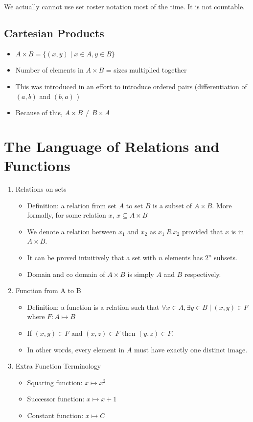 \documentclass[a4paper]{report}
\begin{document}
We actually cannot use set roster notation most of the time. It is not countable.

\subsection{Cartesian Products}

\begin{itemize}
    \item $A \times B = \{(x, y)  \mid x \in A, y \in B\}$
    \item Number of elements in $A \times B$ = sizes multiplied together
    \item This was introduced in an effort to introduce ordered pairs (differentiation of $(a, b)$ and $(b, a)$ )
    \item Because of this, $A \times B \neq B \times A$
\end{itemize}

\section{The Language of Relations and Functions}

\begin{enumerate}
    \item Relations on sets
        \begin{itemize}
            \item Definition: a relation from set $A$ to set $B$ is a subset of $A \times B$. More formally, for some relation $x$, $x \subseteq A \times B$
            \item We denote a relation between $x_1$ and $x_2$ as $x_1 \: R \: x_2$ provided that $x$ is in  $A \times B$.
            \item It can be proved intuitively that a set with $n$ elements has  $2^n$ subsets.
            \item Domain and co domain of $A \times B$ is simply $A$ and  $B$ respectively.
        \end{itemize}
    \item Function from A to B
        \begin{itemize}
            \item Definition: a function is a relation such that $\forall x \in A, \exists y \in B  \mid (x, y) \in F$ where $F: A \mapsto B$
            \item If $(x, y) \in F$ and $(x, z) \in F$ then $(y, z) \in F$.
            \item In other words, every element in $A$ must have exactly one distinct image.
        \end{itemize}
    \item Extra Function Terminology
        \begin{itemize}
            \item Squaring function: $x \mapsto x^2$
            \item Successor function: $x \mapsto x + 1$
            \item Constant function: $x \mapsto C$
        \end{itemize}
\end{enumerate}
\end{document}
